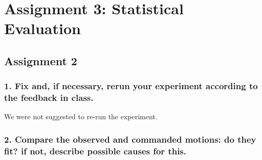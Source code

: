 \section*{Assignment 3: Statistical Evaluation}
\subsection*{Assignment 2}
\subsubsection*{1. Fix and, if necessary, rerun your experiment according to the feedback in class.}
We were not suggested to re-run the experiment.

\subsubsection*{2. Compare the observed and commanded motions: do they fit? if not, describe possible causes for this.} 
